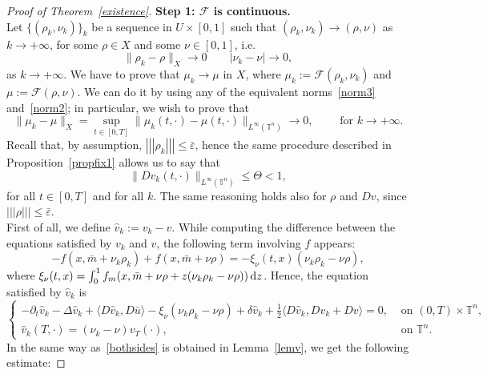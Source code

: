 \documentclass[10pt,a4paper,nouppercase,nowrite]{article}
\numberwithin{equation}{section}
\newcommand{\di}{{\rm d}}
\newcommand{\eps}{\varepsilon}
\newcommand{\T}{\mathbb{T}}
\newcommand{\triplenorm}[1]{%
	\left\lvert\!\left\lvert\!\left\lvert #1
	\right\rvert\!\right\rvert\!\right\rvert}
\theoremstyle{definition}
\begin{document}
\begin{proof}[Proof of Theorem~\ref{existence}]
			\textbf{Step 1: $\mathcal{F}$ is continuous.} \\
			Let $\{ (\rho_k,\nu_k) \}_k$ be a sequence in $U \times [0,1]$ such that $(\rho_k,\nu_k) \to (\rho,\nu)$ as $k \to +\infty$, for some $\rho \in X$ and some $\nu \in [0,1]$, i.e.
			\begin{equation*}
				\| \rho_k - \rho \|_X \to 0 \qquad | \nu_k - \nu | \to 0,
			\end{equation*}
			as $k \to +\infty$. We have to prove that $\mu_k \to \mu$ in $X$, where $\mu_k:=\mathcal{F}(\rho_k,\nu_k)$ and $\mu:=\mathcal{F}(\rho,\nu)$. We can do it by using any of the equivalent norms~\eqref{norm3} and~\eqref{norm2}; in particular, we wish to prove that
			\begin{equation*} 
				\| \mu_k - \mu \|_X = \underset{t \in [0,T]}{\sup} \| \mu_k(t,\cdot) - \mu(t,\cdot) \|_{L^{\infty}(\T^n)} \to 0, \qquad \text{ for } k \to +\infty.
			\end{equation*}
			Recall that, by assumption, $\triplenorm{\rho_k} \le \bar \eps$, hence the same procedure described in Proposition~\ref{propfix1} allows us to say that
			$$\| Dv_k(t,\cdot) \|_{L^{\infty}(\T^n)} \le \Theta < 1,$$
			for all $t \in [0,T]$ and for all $k$.
			The same reasoning holds also for $\rho$ and $Dv$, since $\triplenorm{\rho} \leq  \bar \eps$. \\
			First of all, we define $\hat v_k:=v_k - v$. While computing the difference between the equations satisfied by $v_k$ and $v$, the following term involving $f$ appears:
			\begin{equation*}
				-f(x,\bar m + \nu_k \rho_k) + f(x,\bar m + \nu \rho) = - \xi_\nu(t,x) (\nu_k \rho_k- \nu \rho),
			\end{equation*}
			where $\xi_\nu(t,x)=\int_0^1 f_m(x,\bar m + \nu \rho + z(\nu_k \rho_k - \nu \rho)) \, \di z$. Hence, the equation satisfied by $\hat v_k$ is
			\begin{equation*}
				\begin{cases}
					-\partial_t \hat v_k - \Delta \hat v_k + \langle D\hat v_k , D\bar u \rangle - \xi_{\nu} (\nu_k \rho_k - \nu \rho) + \delta \hat v_k + \frac{1}{2} \langle D \hat v_k , Dv_k + Dv \rangle = 0,& \text{ on } (0,T) \times \T^n, \\
					\hat v_k(T,\cdot) = (\nu_k - \nu) v_T(\cdot),& \text{ on } \T^n.
				\end{cases}
			\end{equation*}
			In the same way as~\eqref{bothsides} is obtained in Lemma~\ref{lemv}, we get the following estimate:

\end{proof}
\end{document}
